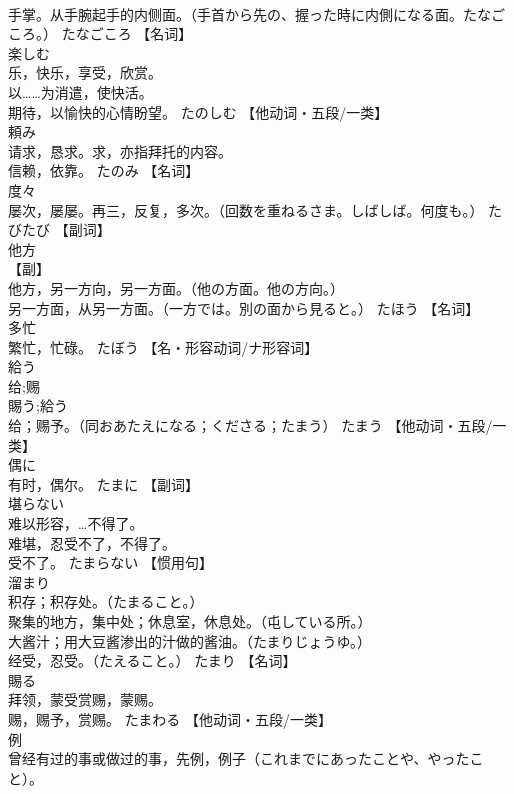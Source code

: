 \documentclass[8pt]{extreport}
\begin{document}
\begin{CJK}{UTF8}{min}
\\	手掌。从手腕起手的内侧面。（手首から先の、握った時に内側になる面。たなごころ。）	たなごころ		【名词】
\\	楽しむ	
\\	乐，快乐，享受，欣赏。 
\\	以……为消遣，使快活。 
\\	期待，以愉快的心情盼望。	たのしむ		【他动词・五段/一类】
\\	頼み	
\\	请求，恳求。求，亦指拜托的内容。 
\\	信赖，依靠。	たのみ		【名词】
\\	度々	
\\	屡次，屡屡。再三，反复，多次。（回数を重ねるさま。しばしば。何度も。）	たびたび		【副词】
\\	他方	
\\	【副】 
\\	他方，另一方向，另一方面。（他の方面。他の方向。） 
\\	另一方面，从另一方面。（一方では。別の面から見ると。）	たほう		【名词】
\\	多忙	
\\	繁忙，忙碌。	たぼう		【名・形容动词/ナ形容词】
\\	給う	
\\	给;赐 
\\	賜う;給う 
\\	给；赐予。（同おあたえになる；くださる；たまう）	たまう		【他动词・五段/一类】
\\	偶に	
\\	有时，偶尔。	たまに		【副词】
\\	堪らない	
\\	难以形容，…不得了。 
\\	难堪，忍受不了，不得了。 
\\	受不了。	たまらない		【惯用句】
\\	溜まり	
\\	积存；积存处。（たまること。） 
\\	聚集的地方，集中处；休息室，休息处。（屯している所。） 
\\	大酱汁；用大豆酱渗出的汁做的酱油。（たまりじょうゆ。） 
\\	经受，忍受。（たえること。）	たまり		【名词】
\\	賜る	
\\	拜领，蒙受赏赐，蒙赐。 
\\	赐，赐予，赏赐。	たまわる		【他动词・五段/一类】
\\	例	
\\	曾经有过的事或做过的事，先例，例子（これまでにあったことや、やったこと）。 

\end{CJK}
\end{document}
